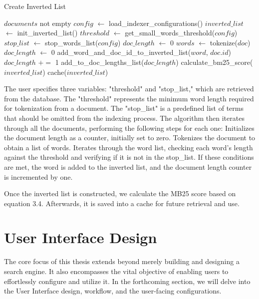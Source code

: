 \begin{algorithm}[H]
	\caption{Create Inverted List}\label{alg:alg2}
	\begin{algorithmic}[1]
	    \Require $documents$ not empty
		\State $config$ $\gets$ load\_indexer\_configurations()
		\State $inverted\_list$ $\gets$ init\_inverted\_list()
		\State $threshold$ $\gets$ get\_small\_words\_threshold($config$)
	    \State $stop\_list$ $\gets$ stop\_words\_list($config$)
          \State $doc\_length$ $\gets$ 0
          \State $words$ $\gets$ tokenize($doc$)
          	\State $doc\_length$ $\gets$ 0
		    	\State add\_word\_and\_doc\_id\_to\_inverted\_list($word$, $doc.id$)
		    	\State $doc\_length$ $\mathrel{+}=$ 1
			\EndIf
          \EndFor
          \State add\_to\_doc\_lengths\_list($doc\_length$)
        \EndFor
        \State calculate\_bm25\_score($inverted\_list$)
        \State cache($inverted\_list$)

	\end{algorithmic}
\end{algorithm}

The user specifies three variables: "threshold" and "stop\_list," which are retrieved from the database. The "threshold" represents the minimum word length required for tokenization from a document. The "stop\_list" is a predefined list of terms that should be omitted from the indexing process.
The algorithm then iterates through all the documents, performing the following steps for each one:
Initializes the document length as a counter, initially set to zero.
Tokenizes the document to obtain a list of words.
Iterates through the word list, checking each word's length against the threshold and verifying if it is not in the stop\_list. If these conditions are met, the word is added to the inverted list, and the document length counter is incremented by one.


Once the inverted list is constructed, we calculate the MB25 score based on equation 3.4. Afterwards, it is saved into a cache for future retrieval and use.

\section{User Interface Design}\label{sec:ui}
The core focus of this thesis extends beyond merely building and designing a search engine. It also encompasses the vital objective of enabling users to effortlessly configure and utilize it. In the forthcoming section, we will delve into the User Interface design, workflow, and the user-facing configurations.

